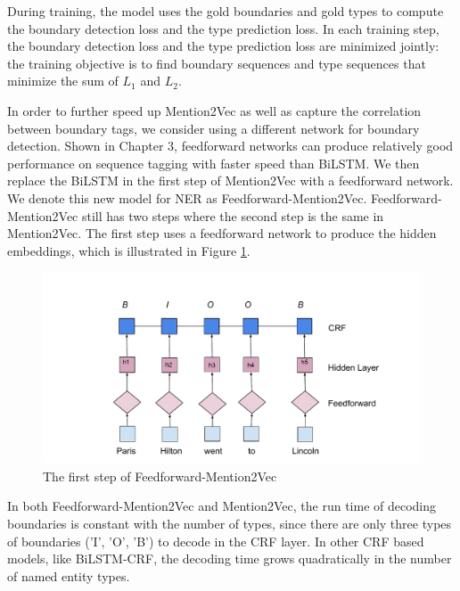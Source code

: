 During training, the model uses the gold boundaries and gold types to compute the boundary detection loss and the type prediction loss. In each training step, the boundary detection loss and the type prediction loss are minimized jointly: the training objective is to find boundary sequences and type sequences that minimize the sum of $L_{1}$ and $L_{2}$.


In order to further speed up Mention2Vec as well as capture the correlation between boundary tags, we consider using a different network for boundary detection. Shown in Chapter 3, feedforward networks can produce relatively good performance on sequence tagging with faster speed than BiLSTM. We then replace the BiLSTM in the first step of Mention2Vec with a feedforward network. We denote this new model for NER as Feedforward-Mention2Vec. Feedforward-Mention2Vec still has two steps where the second step is the same in Mention2Vec. The first step uses a feedforward network to produce the hidden embeddings, which is illustrated in Figure \ref{fig:mention2vec3}.

\begin{figure}
  \centering
  \includegraphics[scale=0.6]{mention2vec3.pdf}
 \caption{The first step of Feedforward-Mention2Vec}
  \label{fig:mention2vec3}
\end{figure}

In both Feedforward-Mention2Vec and Mention2Vec, the run time of decoding boundaries is constant with the number of types, since there are only three types of boundaries ('I', 'O', 'B') to decode in the CRF layer. In other CRF based models, like BiLSTM-CRF, the decoding time grows quadratically in the number of named entity types. 

